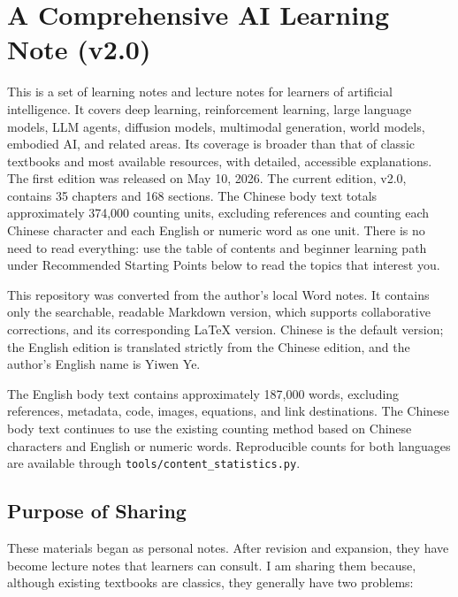 \hypertarget{a-comprehensive-ai-learning-note-v2.0}{%
\chapter{A Comprehensive AI Learning Note (v2.0)}\label{a-comprehensive-ai-learning-note-v2.0}}

This is a set of learning notes and lecture notes for learners of artificial intelligence. It covers deep learning, reinforcement learning, large language models, LLM agents, diffusion models, multimodal generation, world models, embodied AI, and related areas. Its coverage is broader than that of classic textbooks and most available resources, with detailed, accessible explanations. The first edition was released on May 10, 2026. The current edition, v2.0, contains 35 chapters and 168 sections. The Chinese body text totals approximately 374,000 counting units, excluding references and counting each Chinese character and each English or numeric word as one unit. There is no need to read everything: use the table of contents and beginner learning path under Recommended Starting Points below to read the topics that interest you.

This repository was converted from the author's local Word notes. It contains only the searchable, readable Markdown version, which supports collaborative corrections, and its corresponding LaTeX version. Chinese is the default version; the English edition is translated strictly from the Chinese edition, and the author's English name is Yiwen Ye.

The English body text contains approximately 187,000 words, excluding references, metadata, code, images, equations, and link destinations. The Chinese body text continues to use the existing counting method based on Chinese characters and English or numeric words. Reproducible counts for both languages are available through \texttt{tools/content\_statistics.py}.

\hypertarget{purpose-of-sharing}{%
\section{Purpose of Sharing}\label{purpose-of-sharing}}

These materials began as personal notes. After revision and expansion, they have become lecture notes that learners can consult. I am sharing them because, although existing textbooks are classics, they generally have two problems:


